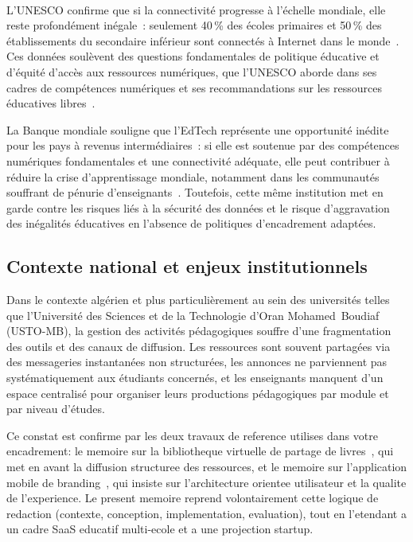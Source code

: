 ﻿﻿\documentclass[12pt,a4paper,oneside]{report}
\begin{document}
L'UNESCO confirme que si la connectivit\'e progresse \`a l'\'echelle mondiale, elle reste profond\'ement in\'egale~: seulement 40\,\% des \'ecoles primaires et 50\,\% des \'etablissements du secondaire inf\'erieur sont connect\'es \`a Internet dans le monde~\cite{unesco_gem_2023}. Ces donn\'ees soul\`event des questions fondamentales de politique \'educative et d'\'equit\'e d'acc\`es aux ressources num\'eriques, que l'UNESCO aborde dans ses cadres de comp\'etences num\'eriques et ses recommandations sur les ressources \'educatives libres~\cite{unesco_oer_2019,unesco_digital_2026}.

La Banque mondiale souligne que l'EdTech repr\'esente une opportunit\'e in\'edite pour les pays \`a revenus interm\'ediaires~: si elle est soutenue par des comp\'etences num\'eriques fondamentales et une connectivit\'e ad\'equate, elle peut contribuer \`a r\'eduire la crise d'apprentissage mondiale, notamment dans les communaut\'es souffrant de p\'enurie d'enseignants~\cite{worldbank_edtech_2026}. Toutefois, cette m\^eme institution met en garde contre les risques li\'es \`a la s\'ecurit\'e des donn\'ees et le risque d'aggravation des in\'egalit\'es \'educatives en l'absence de politiques d'encadrement adapt\'ees.

\subsection{Contexte national et enjeux institutionnels}

Dans le contexte alg\'erien et plus particuli\`erement au sein des universit\'es telles que l'Universit\'e des Sciences et de la Technologie d'Oran Mohamed~Boudiaf (USTO-MB), la gestion des activit\'es p\'edagogiques souffre d'une fragmentation des outils et des canaux de diffusion. Les ressources sont souvent partag\'ees via des messageries instantan\'ees non structur\'ees, les annonces ne parviennent pas syst\'ematiquement aux \'etudiants concern\'es, et les enseignants manquent d'un espace centralis\'e pour organiser leurs productions p\'edagogiques par module et par niveau d'\'etudes.

Ce constat est confirme par les deux travaux de reference utilises dans votre encadrement: le memoire sur la bibliotheque virtuelle de partage de livres~\cite{memoire_bibliotheque_2025}, qui met en avant la diffusion structuree des ressources, et le memoire sur l'application mobile de branding~\cite{memoire_branding_2025}, qui insiste sur l'architecture orientee utilisateur et la qualite de l'experience. Le present memoire reprend volontairement cette logique de redaction (contexte, conception, implementation, evaluation), tout en l'etendant a un cadre SaaS educatif multi-ecole et a une projection startup.
\end{document}

